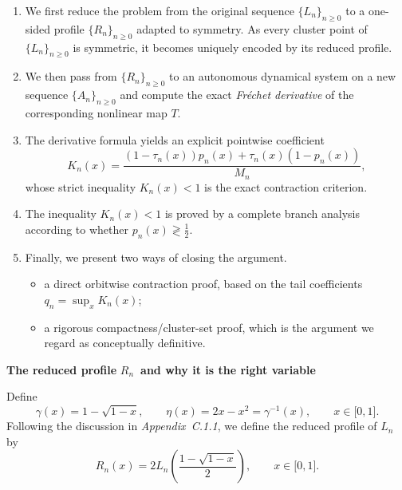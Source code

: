\documentclass[onecolumn]{article}
\begin{document}
\begin{enumerate}
\item We first reduce the problem from the original sequence $%
\{L_{n}\}_{n\geq 0}$ to a one-sided profile $\{R_{n}\}_{n\geq 0}$ adapted to
symmetry. As every cluster point of $\{L_{n}\}_{n\geq 0}$ is symmetric, it
becomes uniquely encoded by its reduced profile.

\item We then pass from $\{R_{n}\}_{n\geq 0}$ to an autonomous dynamical
system on a new sequence $\{A_{n}\}_{n\geq 0}$ and compute the exact \textit{%
Fr\'{e}chet derivative} of the corresponding nonlinear map $T$.

\item The derivative formula yields an explicit pointwise coefficient 
\begin{equation}
K_{n}(x)=\frac{(1-\tau _{n}(x))p_{n}(x)+\tau _{n}(x)(1-p_{n}(x))}{M_{n}},
\label{1601}
\end{equation}%
whose strict inequality $K_{n}(x)<1$ is the exact contraction criterion.

\item The inequality $K_{n}(x)<1$ is proved by a complete branch analysis
according to whether $p_{n}(x)\gtrless \frac{1}{2}$.

\item Finally, we present two ways of closing the argument.

\begin{itemize}
\item[(i)] a direct orbitwise contraction proof, based on the tail
coefficients $q_{n}=\sup_{x}K_{n}(x)$;

\item[(ii)] a rigorous compactness/cluster-set proof, which is the argument
we regard as conceptually definitive.
\end{itemize}
\end{enumerate}

\begin{flushleft}
\textbf{The reduced profile }$R_{n}$\textbf{\ and why it is the right
variable}
\end{flushleft}

Define 
\begin{equation}
\gamma (x)=1-\sqrt{1-x},\qquad \eta (x)=2x-x^{2}=\gamma ^{-1}(x),\qquad x\in
\lbrack 0,1].  \label{1602}
\end{equation}%
Following the discussion in \textit{Appendix~C.1.1}, we define the reduced
profile of $L_{n}$ by 
\begin{equation}
R_{n}(x)=2L_{n}\!\left( \frac{1-\sqrt{1-x}}{2}\right) ,\qquad x\in \lbrack
0,1].  \label{1603}
\end{equation}
\end{document}
